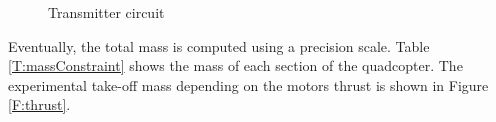 \begin{figure}[H]
\centering
\begin{subfigmatrix}{3}
\vspace{1em} 
\hspace*{\fill}%
\hfill
{}\hfill  
{}
\hspace*{\fill}%
\end{subfigmatrix}
\caption{Transmitter circuit}
\label{F:transmitter}
\end{figure}

Eventually, the total mass is computed using a precision scale. Table \ref{T:massConstraint} shows the mass of each section of the quadcopter. The experimental take-off mass depending on the motors thrust is shown in Figure \ref{F:thrust}. 


